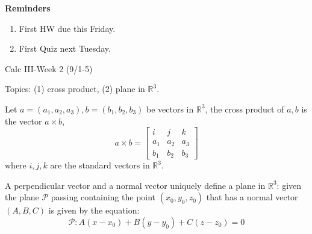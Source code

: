 \documentclass[openany]{book}
\newcommand{\R}{\mathbb{R}}
\begin{document}
\noindent
\textbf{Reminders}
\begin{enumerate}
    \item First HW due this Friday.
    \item First Quiz next Tuesday.
\end{enumerate}





\newpage



\begin{center}
    \Large Calc III-Week 2 (9/1-5)
\end{center}



\renewcommand\thesection{\arabic{section}}
\noindent
Topics: (1) cross product, (2) plane in $\R^3$.

\begin{defn}
    Let $a=(a_1,a_2,a_3), b=(b_1,b_2,b_3)$ be vectors in $\R^3$, the cross product of $a,b$ is the vector $a\times b$, 
    \begin{equation*}
        a\times b=\begin{bmatrix}
            i&j&k\\
            a_1&a_2&a_3\\
            b_1&b_2&b_3
        \end{bmatrix}
    \end{equation*}
    where $i,j,k$ are the standard vectors in $\R^3$.
\end{defn}

\begin{defn}
    A perpendicular vector and a normal vector uniquely define a plane in $\R^3$: given the plane $\mathcal{P}$ passing containing the point $(x_0,y_0,z_0)$ that has a normal vector $(A,B,C)$ is given by the equation:
    \begin{equation*}
        \mathcal{P}: A(x-x_0)+B(y-y_0)+C(z-z_0)=0
    \end{equation*}
\end{defn}
\end{document}
